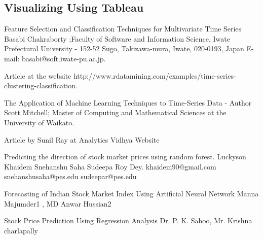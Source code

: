\documentclass{article}
\begin{document}
\subsection {Visualizing Using Tableau}



\begin{thebibliography}{References}
 Feature Selection and Classification Techniques for Multivariate Time Series
Basabi Chakraborty ;Faculty of Software and Information Science, Iwate Prefectural University - 152-52 Sugo, Takizawa-mura, Iwate, 020-0193, Japan E-mail: basabi@soft.iwate-pu.ac.jp.\newline

 Article at the website http://www.rdatamining.com/examples/time-series-clustering-classification.\newline

 The Application of Machine Learning Techniques to Time-Series Data - Author Scott Mitchell; Master of Computing and Mathematical Sciences at the University of Waikato. \newline

 Article by Sunil Ray at Analytics Vidhya Website

 Predicting the direction of stock market prices using random forest. Luckyson Khaidem Snehanshu Saha Sudeepa Roy Dey. khaidem90@gmail.com snehanshusaha@pes.edu sudeepar@pes.edu

 Forecasting of Indian Stock Market Index Using Artificial Neural Network Manna Majumder1 , MD Anwar Hussian2

 Stock Price Prediction Using Regression Analysis Dr. P. K. Sahoo, Mr. Krishna charlapally

\end{thebibliography}
\end{document}
